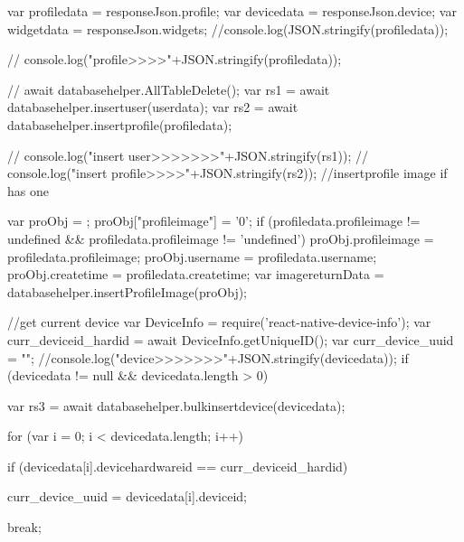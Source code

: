 {{{{{{{{{{{{{                      var profiledata = responseJson.profile;
                      var devicedata = responseJson.device;
                      var widgetdata = responseJson.widgets;
                       //console.log(JSON.stringify(profiledata));

                      //  console.log("profile>>>>"+JSON.stringify(profiledata));

                      // await databasehelper.AllTableDelete();                     
                      var rs1 = await databasehelper.insertuser(userdata);                     
                      var rs2 = await databasehelper.insertprofile(profiledata);
                      
                      //   console.log("insert user>>>>>>>"+JSON.stringify(rs1));
                      //   console.log("insert profile>>>>"+JSON.stringify(rs2));
                      //insertprofile image if has one

                      var proObj = {};
                            proObj["profileimage"] = '0';
                            if (profiledata.profileimage != undefined && profiledata.profileimage != 'undefined') {
                              proObj.profileimage = profiledata.profileimage;
                            }
                            proObj.username = profiledata.username;
                            proObj.createtime = profiledata.createtime;
                            var imagereturnData = databasehelper.insertProfileImage(proObj);


                      //get current device
                      var DeviceInfo = require('react-native-device-info');
                      var curr_deviceid_hardid = await DeviceInfo.getUniqueID();
                      var curr_device_uuid = "";
                      //console.log("device>>>>>>>"+JSON.stringify(devicedata));
                      if (devicedata != null && devicedata.length > 0) {
                        var rs3 = await databasehelper.bulkinsertdevice(devicedata);

                      
                        for (var i = 0; i < devicedata.length; i++) {

                          if (devicedata[i].devicehardwareid == curr_deviceid_hardid) {
                            curr_device_uuid = devicedata[i].deviceid;

                            break;
                          }

                        }

}}}}}}}}}}}}}}
